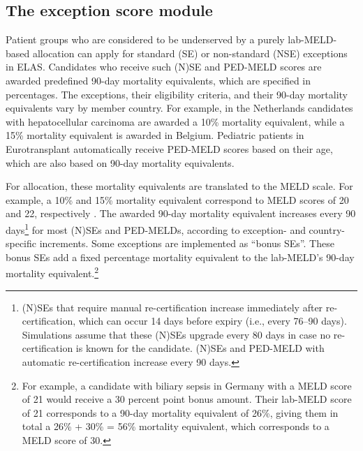 \documentclass[11pt,twoside,]{book}
\let\rmarkdownfootnote\footnote%
\def\footnote{\protect\rmarkdownfootnote}
\begin{document}
\subsection{The exception score module}\label{sec:elasexceptions}

Patient groups who are considered to be underserved by a purely
lab-MELD-based allocation can apply for standard (SE) or non-standard
(NSE) exceptions in ELAS. Candidates who receive such (N)SE and
PED-MELD scores are awarded predefined 90-day mortality equivalents,
which are specified in percentages. The exceptions, their eligibility criteria,
and their 90-day mortality equivalents vary by member country. For example,
in the Netherlands candidates with hepatocellular carcinoma are awarded a 10\%
mortality equivalent, while a 15\% mortality equivalent is awarded in Belgium.
Pediatric patients in Eurotransplant automatically receive PED-MELD scores based
on their age, which are also based on 90-day mortality equivalents.

For allocation, these mortality equivalents are translated to the MELD scale.
For example, a
10\% and 15\% mortality equivalent correspond to MELD scores of 20 and 22,
respectively \citep{ETLiverMan2025}. The awarded 90-day mortality equivalent
increases every 90 days\footnote{(N)SEs that require manual re-certification increase immediately after re-certification, which can occur 14 days before expiry (i.e., every 76--90 days). Simulations assume that these (N)SEs upgrade every 80 days in case no re-certification is known for the candidate. (N)SEs and PED-MELD with automatic re-certification increase every 90 days.} for most (N)SEs and PED-MELDs, according to
exception- and country-specific increments. Some exceptions are implemented
as ``bonus SEs''. These bonus SEs add a fixed percentage mortality equivalent to the
lab-MELD's 90-day mortality equivalent.\footnote{For example, a candidate with biliary
  sepsis in Germany with a MELD score of 21 would receive a 30 percent point
  bonus amount. Their lab-MELD score of 21 corresponds to a 90-day mortality
  equivalent of 26\%, giving them in total a 26\% + 30\% = 56\% mortality equivalent,
  which corresponds to a MELD score of 30.}
\end{document}
